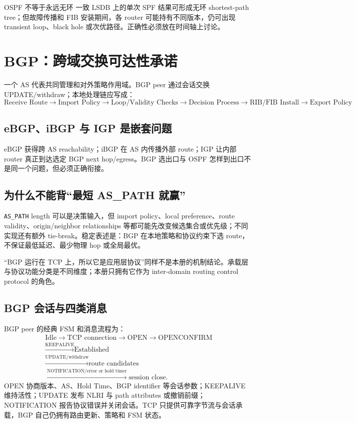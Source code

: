 \documentclass[11pt,a4paper]{ctexart}
\newcommand{\code}[1]{\texttt{#1}}
\begin{document}
\begin{warnbox}{OSPF 不等于永远无环}
一致 LSDB 上的单次 SPF 结果可形成无环 shortest-path tree；但故障传播和 FIB 安装期间，各 router 可能持有不同版本，仍可出现 transient loop、black hole 或次优路径。正确性必须放在时间轴上讨论。
\end{warnbox}

\section{BGP：跨域交换可达性承诺}

一个 AS 代表共同管理和对外策略作用域。BGP peer 通过会话交换 UPDATE/withdraw；本地处理链应写成：
\[
\boxed{
\text{Receive Route}
\to\text{Import Policy}
\to\text{Loop/Validity Checks}
\to\text{Decision Process}
\to\text{RIB/FIB Install}
\to\text{Export Policy}}
\]

\subsection{eBGP、iBGP 与 IGP 是嵌套问题}

eBGP 获得跨 AS reachability；iBGP 在 AS 内传播外部 route；IGP 让内部 router 真正到达选定 BGP next hop/egress。BGP 选出口与 OSPF 怎样到出口不是同一个问题，但必须正确衔接。

\subsection{为什么不能背“最短 AS\_PATH 就赢”}

\code{AS\_PATH} length 可以是决策输入，但 import policy、local preference、route validity、origin/neighbor relationships 等都可能先改变候选集合或优先级；不同实现还有额外 tie-break。稳定表述是：BGP 在本地策略和协议约束下选 route，不保证最低延迟、最少物理 hop 或全局最优。

“BGP 运行在 TCP 上，所以它是应用层协议”同样不是本册的机制结论。承载层与协议功能分类是不同维度；本册只拥有它作为 inter-domain routing control protocol 的角色。

\subsection{BGP 会话与四类消息}

BGP peer 的经典 FSM 和消息流程为：
\[
\begin{gathered}
\text{Idle}\to\text{TCP connection}\to\text{OPEN}\to\text{OPENCONFIRM}\\
\xrightarrow{\text{KEEPALIVE}}\text{Established}\\
\xrightarrow{\text{UPDATE/withdraw}}\text{route candidates}\\
\xrightarrow{\text{NOTIFICATION/error or hold timer}}\text{session close}.
\end{gathered}
\]
OPEN 协商版本、AS、Hold Time、BGP identifier 等会话参数；KEEPALIVE 维持活性；UPDATE 发布 NLRI 与 path attributes 或撤销前缀；NOTIFICATION 报告协议错误并关闭会话。TCP 只提供可靠字节流与会话承载，BGP 自己仍拥有路由更新、策略和 FSM 状态。
\end{document}
